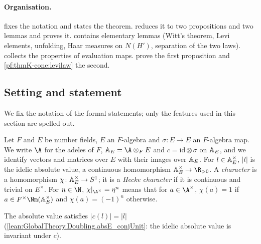 \paragraph{Organisation.}
 fixes the notation and states the theorem.   reduces it
to two propositions and two lemmas and proves it.   contains elementary lemmas
(Witt's theorem, Levi elements, unfolding, Haar measures on $N(H')$, separation of the two laws).
 collects the properties of evaluation maps.
 prove the first
proposition and \cref{pf:thmK-cone:levilaw} the second.

\subsection{Setting and statement}\label{pf:thmK-cone:setting}

We fix the notation of the formal statements; only the features used in this section are spelled out.

\begin{definition}\label{pf:thmK-cone:def-adelic}
Let $F$ and $E$ be number fields, $E$ an $F$-algebra and $\sigma\colon E\to E$ an $F$-algebra map.  We write $\A$ for
the adeles of $F$, $\thmKconeAE=\A\otimes_FE$ and $c=\mathrm{id}\otimes\sigma$ on $\mathbb{A}_E$, and we identify vectors
and matrices over $E$ with their images over $\mathbb{A}_E$.  For $l\in\mathbb{A}_E^\times$, $|l|$ is the idelic absolute
value, a continuous homomorphism $\thmKconeAE^\times\to\R_{>0}$.  A \emph{character} is a homomorphism
$\chi\colon\mathbb{A}_E^\times\to S^1$; it is a \emph{Hecke character} if it is continuous and trivial on $E^\times$.  For
$n\in\N$, $\chi|_{\A^\times}=\eta^n$ means that for $a\in\A^\times$, $\chi(a)=1$ if $a\in F^\times\Nm(\thmKconeAE^\times)$
and $\chi(a)=(-1)^n$ otherwise.
\end{definition}

The absolute value satisfies $|c(l)|=|l|$ (\cref{lean:GlobalTheory.Doubling.absE_conjUnit}: the idelic absolute value is
invariant under $c$).

